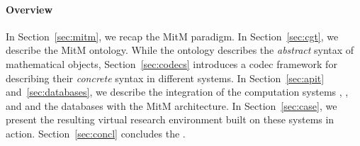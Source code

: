 \paragraph{Overview}
In Section~\ref{sec:mitm}, we recap the MitM paradigm.
In Section~\ref{sec:cgt}, we describe the MitM ontology.
While the ontology describes the \emph{abstract} syntax of mathematical objects, Section~\ref{sec:codecs} introduces a codec framework for describing their \emph{concrete} syntax in different systems.
In Section~\ref{sec:apit} and~\ref{sec:databases}, we describe the integration of the computation systems \GAP, \Sage, and \Singular and the \lmfdb databases with the MitM architecture.
In Section~\ref{sec:case}, we present the resulting virtual research environment built on
these systems in action.
Section~\ref{sec:concl} concludes the \papertype.



